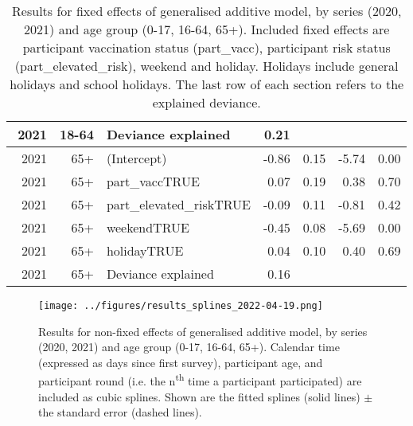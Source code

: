 \documentclass[fleqn,10pt]{wlscirep}
\begin{document}
\begin{table}[ht]
\begin{tabular}{rrlrrrr}
$$  2021 & 18-64 & Deviance explained & 0.21 &  &  &  \\ 
  \hline 
  2021 & 65+ & (Intercept) & -0.86 & 0.15 & -5.74 & 0.00 \\ 
  2021 & 65+ & part\_vaccTRUE & 0.07 & 0.19 & 0.38 & 0.70 \\ 
  2021 & 65+ & part\_elevated\_riskTRUE & -0.09 & 0.11 & -0.81 & 0.42 \\ 
  2021 & 65+ & weekendTRUE & -0.45 & 0.08 & -5.69 & 0.00 \\ 
  2021 & 65+ & holidayTRUE & 0.04 & 0.10 & 0.40 & 0.69 \\ 
  2021 & 65+ & Deviance explained & 0.16 &  &  &  \\ 
   \hline
\end{tabular}
\caption{\label{tab:fixed_effects}Results for fixed effects of generalised additive model, by series (2020, 2021) and age group (0-17, 16-64, 65+). Included fixed effects are participant vaccination status (part\_vacc), participant risk status (part\_elevated\_risk), weekend and holiday. Holidays include general holidays and school holidays. The last row of each section refers to the explained deviance. } 
\end{table}

\begin{figure}[ht]
\centering
\texttt{[image: ../figures/results\_splines\_2022-04-19.png]}
\caption{Results for non-fixed effects of generalised additive model, by series (2020, 2021) and age group (0-17, 16-64, 65+). Calendar time (expressed as days since first survey), participant age, and participant round (i.e. the n\textsuperscript{th} time a participant participated) are included as cubic splines. Shown are the fitted splines (solid lines) $\pm$ the standard error (dashed lines).}
\label{fig:splines}
\end{figure}
\end{document}
